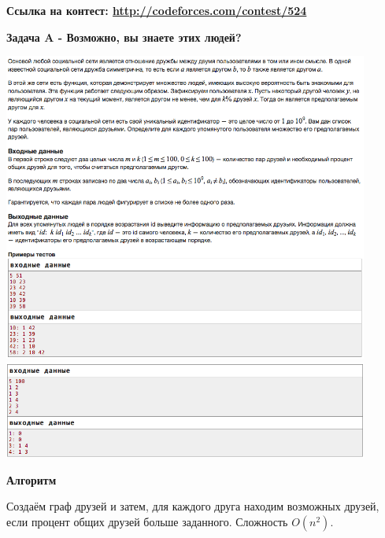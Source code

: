 \documentclass[a4paper,12pt]{article}
\begin{document}
\textbf{{\large Ссылка на контест: \url{http://codeforces.com/contest/524}}}

\newpage
\textbf{{\large Задача A - Возможно, вы знаете этих людей?}} \\
\begin{center}
\includegraphics[width=0.9\textwidth]{VK_R_1/VK_1_A1.png}\\
\includegraphics[width=0.9\textwidth]{VK_R_1/VK_1_A2.png}\\ [1cm]
\end{center}

\newpage
\textbf{{\large Алгоритм}}

Создаём граф друзей и затем, для каждого друга находим возможных друзей, если процент общих друзей больше заданного. Сложность $O(n^2)$.\\
\end{document}
